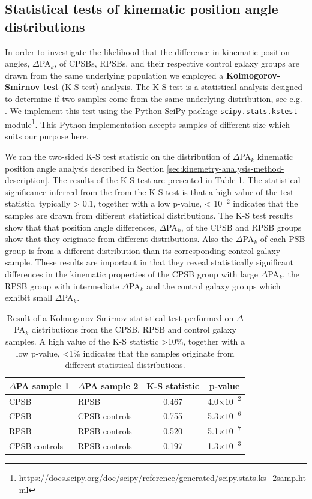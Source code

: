 \subsection{Statistical tests of kinematic position angle distributions}
\label{sec:K-S-test}
In order to investigate the likelihood that the difference in kinematic position angles, $\Delta$PA$_{k}$, of CPSBs, RPSBs, and their respective control galaxy groups are drawn from the same underlying population we employed a \textbf{Kolmogorov-Smirnov test} (K-S test) analysis. The K-S test is a statistical analysis designed to determine if two samples come from the same underlying distribution, see e.g. \citet{hodges1958significance}. We implement this test using the Python SciPy package \texttt{scipy.stats.kstest} module\footnote{\href{https://docs.scipy.org/doc/scipy/reference/generated/scipy.stats.ks\_2samp.html}{https://docs.scipy.org/doc/scipy/reference/generated/scipy.stats.ks\_2samp.html}}. This Python implementation accepts samples of different size which suits our purpose here.

We ran the two-sided K-S test statistic on the distribution of $\Delta$PA$_{k}$ kinematic position angle analysis described in Section \ref{sec:kinemetry-analysis-method-description}. The results of the K-S test are presented in Table \ref{tab:K-S-tests}. The statistical significance inferred from the from the K-S test is that a high value of the test statistic, typically > 0.1, together with a low p-value, < 10$^{-2}$ indicates that the samples are drawn from different statistical distributions. The K-S test results show that  that position angle differences, $\Delta$PA$_{k}$, of the CPSB and RPSB groups show that they originate from different distributions. Also the $\Delta$PA$_{k}$ of each PSB group is from a different distribution than its corresponding control galaxy sample. These results are important in that they reveal statistically significant differences in the kinematic properties of the CPSB group with large $\Delta$PA$_{k}$, the RPSB group with intermediate $\Delta$PA$_{k}$ and the control galaxy groups which exhibit small $\Delta$PA$_{k}$. 

\begin{table}
\caption[Kolmogorov-Smirnov statistical test of $\Delta$PA distributions]{Result of a Kolmogorov-Smirnov statistical test performed on $\Delta$PA$_{k}$ distributions from the CPSB, RPSB and control galaxy samples. A high value of the K-S statistic \textgreater 10\%, together with a low p-value, \textless 1\% indicates that the samples originate from different statistical distributions.}
\label{tab:K-S-tests}
\begin{tabular}{llcc}
\hline
$\Delta$PA sample 1  & $\Delta$PA sample 2 & K-S statistic & p-value \\
\hline
CPSB & RPSB & 0.467 & 4.0$\times10^{-2}$ \\
CPSB & CPSB controls & 0.755 & 5.3$\times10^{-6}$ \\
RPSB & RPSB controls & 0.520 & 5.1$\times10^{-7}$ \\
CPSB controls & RPSB controls & 0.197 & 1.3$\times10^{-3}$ \\
\hline
\end{tabular}
\end{table}

